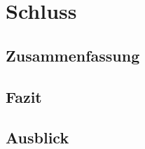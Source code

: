 
\chapter{Schluss}\label{ch:fazit}

\section{Zusammenfassung}\label{sec:zusammenfassung}

\section{Fazit}\label{sec:fazit}

\section{Ausblick}\label{sec:ausblick}
